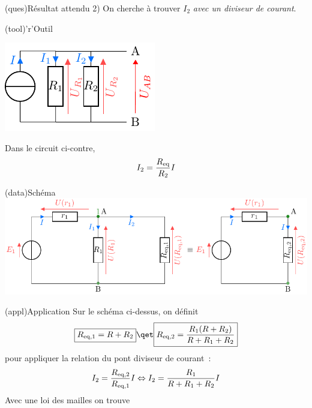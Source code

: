 \documentclass[../../main/main.tex]{subfiles}
\begin{document}
{\begin{tcbraster}[raster columns=2, raster equal height=rows]
    \begin{tcb}[](ques){Résultat attendu}
        2)
        On cherche à trouver $I_2$ \textit{avec un diviseur de courant}.
    \end{tcb}
    \begin{tcb}[sidebyside, righthand ratio=0.4](tool)'r'{Outil}
        \begin{center}
            \includegraphics[]{divcour}
        \end{center}
        \tcblower
        \begin{center}
            Dans le circuit ci-contre,
            \[ I_2 = \frac{R_{\rm eq}}{R_2}I\]
        \end{center}
    \end{tcb}
\end{tcbraster}
\begin{tcb}[](data){Schéma}
    \includegraphics[width=\linewidth]{calc_intens-divcour}
\end{tcb}
\begin{tcb}(appl){Application}
    Sur le schéma ci-dessus, on définit
    \[ \boxed{R_{\rm eq,1} = R+R_2} \qet \boxed{R_{\rm eq,2} =
        \frac{R_1(R+R_2)}{R + R_1 + R_2}}\]
    pour appliquer la relation du pont diviseur de courant~:
    \begin{equation*}
        I_2                 = \frac{R_{\rm eq, 2}}{R_{\rm eq,1}}I
        \Leftrightarrow I_2 = \frac{R_1}{R + R_1 + R_2}I
    \end{equation*}
    \tcblower
    Avec une loi des mailles on trouve
    \begin{equation*}

\end{equation*}
\end{tcb}}
\end{document}
